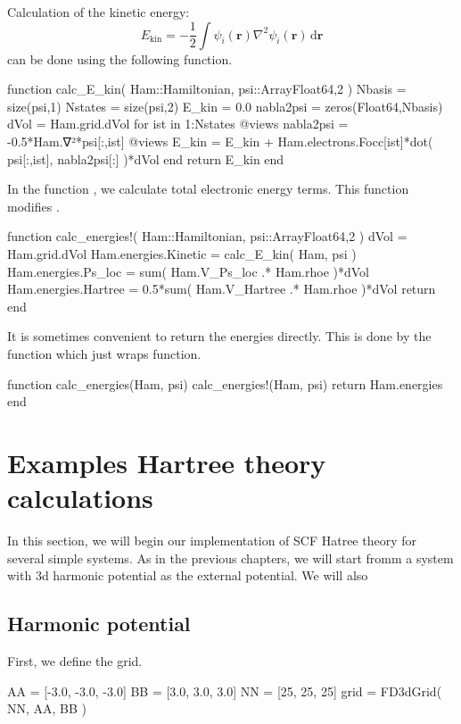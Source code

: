 Calculation of the kinetic energy:
\begin{equation}
E_{\mathrm{kin}} =
-\frac{1}{2} \int \psi_{i}(\mathbf{r}) \nabla^{2} \psi_{i}(\mathbf{r})\,\mathrm{d}\mathbf{r}
\end{equation}
can be done using the following function.
\begin{juliacode}
function calc_E_kin( Ham::Hamiltonian, psi::Array{Float64,2} )
  Nbasis = size(psi,1)
  Nstates = size(psi,2)
  E_kin = 0.0
  nabla2psi = zeros(Float64,Nbasis)
  dVol = Ham.grid.dVol
  for ist in 1:Nstates
    @views nabla2psi = -0.5*Ham.∇²*psi[:,ist]
    @views E_kin = E_kin + Ham.electrons.Focc[ist]*dot( psi[:,ist], nabla2psi[:] )*dVol
  end
  return E_kin
end
\end{juliacode}

In the function , we calculate total electronic energy terms.
This function modifies .
\begin{juliacode}
function calc_energies!( Ham::Hamiltonian, psi::Array{Float64,2} )
  dVol = Ham.grid.dVol
  Ham.energies.Kinetic = calc_E_kin( Ham, psi )
  Ham.energies.Ps_loc = sum( Ham.V_Ps_loc .* Ham.rhoe )*dVol
  Ham.energies.Hartree = 0.5*sum( Ham.V_Hartree .* Ham.rhoe )*dVol
  return
end
\end{juliacode}
It is sometimes convenient to return the energies directly. This is done by
the function  which just wraps 
function.
\begin{juliacode}
function calc_energies(Ham, psi)
  calc_energies!(Ham, psi)
  return Ham.energies
end
\end{juliacode}


\section{Examples Hartree theory calculations}

In this section, we will begin our implementation of SCF Hatree theory for several
simple systems.
As in the previous chapters, we will start fromm a system with 3d harmonic potential as the
external potential. We will also 

\subsection{Harmonic potential}

First, we define the grid.
\begin{juliacode}
AA = [-3.0, -3.0, -3.0]
BB = [3.0, 3.0, 3.0]
NN = [25, 25, 25]
grid = FD3dGrid( NN, AA, BB )
\end{juliacode}

